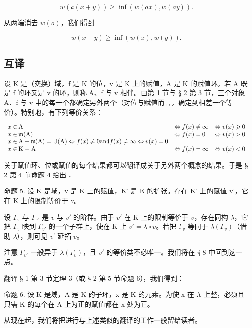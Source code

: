 \[
w (a (x + y)) \geqslant \inf (w (a x), w (a y)).
\]

从两端消去 \(w(a)\)，我们得到

\[
w (x + y) \geqslant \inf (w (x), w (y)).
\]

\subsection{互译}

设 K 是（交换）域，f 是 K 的位，v 是 K 上的赋值，A 是 K 的赋值环。若 A 既是 f 的环又是 v 的环，则称 A、f 与 v 相伴。由第 1 节与 § 2 第 3 节，三个对象 A、f 与 v 中的每一个都确定另外两个（对位与赋值而言，确定到相差一个等价）。特别地，有下列等价关系：

\[
\begin{array}{l l l l} x \in \mathrm{A} & \Leftrightarrow f (x) \neq \infty & \Leftrightarrow v (x) \geqslant 0 \\ x \in \mathfrak {m} (\mathrm{A}) & \Leftrightarrow f (x) = 0 & \Leftrightarrow v (x) > 0 \\ x \in \mathrm{A} - \mathfrak {m} (\mathrm{A}) = \mathrm{U} (\mathrm{A}) \Leftrightarrow f (x) \neq 0 \text {and} f (x) \neq \infty \Leftrightarrow v (x) = 0 \\ x \in \mathrm{K} - \mathrm{A} & \Leftrightarrow f (x) = \infty & \Leftrightarrow v (x) <   0 \end{array}
\]

关于赋值环、位或赋值的每个结果都可以翻译成关于另外两个概念的结果。于是 § 2 第 4 节命题 4 给出：

命题 5. 设 K 是域，v 是 K 上的赋值，K' 是 K 的扩张。存在 K' 上的赋值 v'，它在 K 上的限制等价于 v。

设 \(\Gamma_v\) 与 \(\Gamma_{v'}\) 是 \(v\) 与 \(v'\) 的阶群。由于 \(v'\) 在 K 上的限制等价于 \(v\)，存在同构 \(\lambda\)，它把 \(\Gamma_v\) 映到 \(\Gamma_{v'}\) 的一个子群上，使在 K 上 \(v' = \lambda \circ v\)。若把 \(\Gamma_v\) 等同于 \(\lambda(\Gamma_v)\)（借助 \(\lambda\)），则可见 \(v'\) 延拓 \(v\)。

注意 \(\Gamma_{v'}\) 一般异于 \(\lambda(\Gamma_v)\)，且 \(v'\) 的等价类不必唯一。我们将在 § 8 中回到这一点。

翻译 § 1 第 3 节定理 3（或 § 2 第 5 节命题 6），我们得到：

命题 6. 设 K 是域，A 是 K 的子环，x 是 K 的元素。为使 x 在 A 上整，必须且只需 K 的每个在 A 上为正的赋值都在 x 处为正。

从现在起，我们将把进行与上述类似的翻译的工作一般留给读者。

